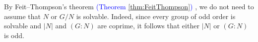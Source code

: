 By Feit--Thompson's theorem \textcolor{blue}{(Theorem \ref{thm:FeitThompson})} , we do not need to assume that
$N$ or $G/N$ is solvable. Indeed, since every group of odd order is solvable and
$|N|$ and $(G:N)$ are coprime, it follows that either $|N|$ or $(G:N)$ is odd. 


%

%
%
%
%	
